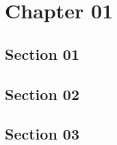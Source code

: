\chapter{Chapter 01}
\section{Section 01}
\lipsum[1-5]
\section{Section 02}
\lipsum[1-5]
\section{Section 03}
\lipsum[1-5]